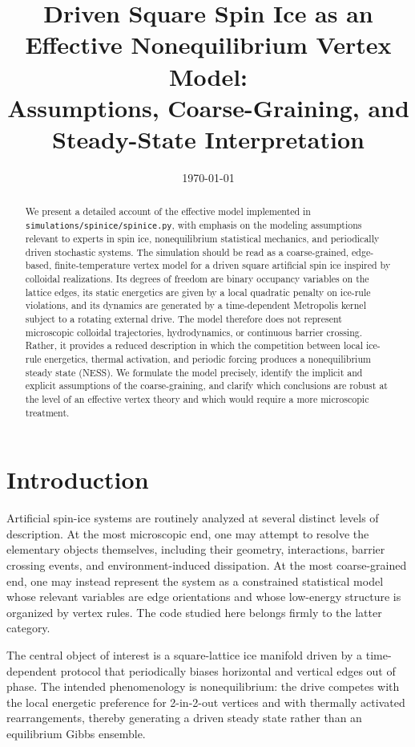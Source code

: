 \documentclass[11pt]{article}
\title{Driven Square Spin Ice as an Effective Nonequilibrium Vertex Model:\\
Assumptions, Coarse-Graining, and Steady-State Interpretation}
\author{}
\date{\today}
\begin{document}
\maketitle

\begin{abstract}
We present a detailed account of the effective model implemented in
\texttt{simulations/spinice/spinice.py}, with emphasis on the modeling
assumptions relevant to experts in spin ice, nonequilibrium statistical
mechanics, and periodically driven stochastic systems. The simulation should be
read as a coarse-grained, edge-based, finite-temperature vertex model for a
driven square artificial spin ice inspired by colloidal realizations. Its
degrees of freedom are binary occupancy variables on the lattice edges, its
static energetics are given by a local quadratic penalty on ice-rule
violations, and its dynamics are generated by a time-dependent Metropolis
kernel subject to a rotating external drive. The model therefore does not
represent microscopic colloidal trajectories, hydrodynamics, or continuous
barrier crossing. Rather, it provides a reduced description in which the
competition between local ice-rule energetics, thermal activation, and periodic
forcing produces a nonequilibrium steady state (NESS). We formulate the model
precisely, identify the implicit and explicit assumptions of the
coarse-graining, and clarify which conclusions are robust at the level of an
effective vertex theory and which would require a more microscopic treatment.
\end{abstract}

\section{Introduction}

Artificial spin-ice systems are routinely analyzed at several distinct levels
of description. At the most microscopic end, one may attempt to resolve the
elementary objects themselves, including their geometry, interactions, barrier
crossing events, and environment-induced dissipation. At the most coarse-grained
end, one may instead represent the system as a constrained statistical model
whose relevant variables are edge orientations and whose low-energy structure is
organized by vertex rules. The code studied here belongs firmly to the latter
category.

The central object of interest is a square-lattice ice manifold driven by a
time-dependent protocol that periodically biases horizontal and vertical edges
out of phase. The intended phenomenology is nonequilibrium: the drive competes
with the local energetic preference for 2-in-2-out vertices and with
thermally activated rearrangements, thereby generating a driven steady state
rather than an equilibrium Gibbs ensemble.
\end{document}
